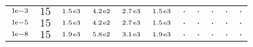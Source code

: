 \begin{tiny}
\begin{tabular}{@{$\;$}c@{$\;$}|@{$\;$}c@{$\;$}@{$\;$}c@{$\;$}@{$\;$}c@{$\;$}@{$\;$}c@{$\;$}@{$\;$}c@{$\;$}|@{$\;$}c@{$\;$}@{$\;$}c@{$\;$}@{$\;$}c@{$\;$}@{$\;$}c@{$\;$}@{$\;$}c@{$\;$}}
$\scriptstyle1\!\mathrm{\hspace{0.10em}e}-3$ & $\scriptstyle15$ & $\scriptstyle1.5\mathrm{\hspace{0.10em}e}3$ & $\scriptstyle4.2\mathrm{\hspace{0.10em}e}2$ & $\scriptstyle2.7\mathrm{\hspace{0.10em}e}3$ & $\scriptstyle1.5\mathrm{\hspace{0.10em}e}3$ & $\scriptstyle.$ & $\scriptstyle.$ & $\scriptstyle.$ & $\scriptstyle.$ & $\scriptstyle.$\\ 
$\scriptstyle1\!\mathrm{\hspace{0.10em}e}-5$ & $\scriptstyle15$ & $\scriptstyle1.5\mathrm{\hspace{0.10em}e}3$ & $\scriptstyle4.2\mathrm{\hspace{0.10em}e}2$ & $\scriptstyle2.7\mathrm{\hspace{0.10em}e}3$ & $\scriptstyle1.5\mathrm{\hspace{0.10em}e}3$ & $\scriptstyle.$ & $\scriptstyle.$ & $\scriptstyle.$ & $\scriptstyle.$ & $\scriptstyle.$\\ 
$\scriptstyle1\!\mathrm{\hspace{0.10em}e}-8$ & $\scriptstyle15$ & $\scriptstyle1.9\mathrm{\hspace{0.10em}e}3$ & $\scriptstyle5.8\mathrm{\hspace{0.10em}e}2$ & $\scriptstyle3.1\mathrm{\hspace{0.10em}e}3$ & $\scriptstyle1.9\mathrm{\hspace{0.10em}e}3$ & $\scriptstyle.$ & $\scriptstyle.$ & $\scriptstyle.$ & $\scriptstyle.$ & $\scriptstyle.$\\ 
\end{tabular} 
\end{tiny} 
